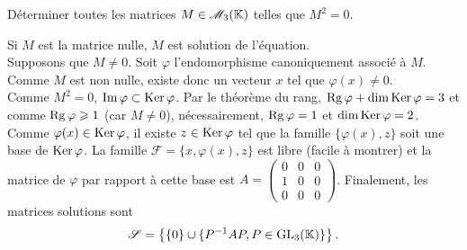 \begin{exercice}
    Déterminer toutes les matrices $M \in \mathscr{M}_3(\mathbb{K})$ telles que $M^2=0$.
\end{exercice}

\begin{solution}
    Si $M$ est la matrice nulle, $M$ est solution de l'équation. \\
    Supposons que $M \not= 0$. Soit $\varphi$ l'endomorphisme canoniquement associé à $M$. \\
    Comme $M$ est non nulle, existe donc un vecteur $x$ tel que $\varphi(x) \not= 0$. \\
    Comme $M^2 = 0$, $\Im \varphi \subset \mathrm{Ker}\, \varphi$. Par le théorème du rang, $\mathrm{Rg}\, \varphi + \dim \mathrm{Ker}\, \varphi = 3$ et comme $\mathrm{Rg}\, \varphi \geqslant 1$ (car $M \not=0$), nécessairement, $\mathrm{Rg}\, \varphi = 1$ et $\dim \mathrm{Ker}\, \varphi = 2$. \\
    Comme $\varphi(x) \in \mathrm{Ker}\, \varphi$, il existe $z \in \mathrm{Ker}\, \varphi$ tel que la famille $\{ \varphi(x), z \}$ soit une base de $\mathrm{Ker}\, \varphi$. La famille $\mathscr{F} = \{x, \varphi(x), z \}$ est libre (facile à montrer) et la matrice de $\varphi$ par rapport à cette base est 
    $A = 
    \begin{pmatrix}
    0 & 0 & 0 \\
    1 & 0 & 0 \\ 
    0 & 0 & 0
    \end{pmatrix}
    $. 
    Finalement, les matrices solutions sont
    $$\mathscr{S} = \left \{ \{0\} \cup \{P^{-1} A P, P \in \mathrm{GL}_3(\mathbb{K}) \} \right \}.$$
\end{solution}
